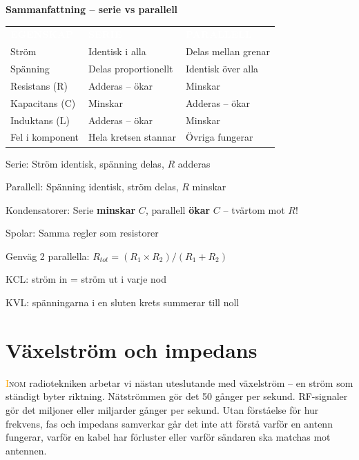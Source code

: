 \documentclass[a4paper,11pt,twoside]{book}
\newcommand{\emoji}[1]{{\emojifont #1}}
\newcommand{\tblhdr}[1]{\cellcolor{greydark}\textcolor{white}{\headingfont\bfseries\footnotesize\MakeUppercase{#1}}}
\begin{document}
\begin{center}
\noindent\textbf{Sammanfattning -- serie vs parallell}\\[4mm]
\begin{tabular}{L{3cm}L{3.5cm}L{3.5cm}}
\tblhdr{Egenskap} & \tblhdr{Serie} & \tblhdr{Parallell} \\
Ström & Identisk i alla & Delas mellan grenar \\
Spänning & Delas proportionellt & Identisk över alla \\
Resistans (R) & Adderas -- ökar & Minskar \\
Kapacitans (C) & Minskar & Adderas -- ökar \\
Induktans (L) & Adderas -- ökar & Minskar \\
Fel i komponent & Hela kretsen stannar & Övriga fungerar \\
\end{tabular}
\end{center}

\begin{orangebox}[title={\emoji{🎯} Viktigt för provet}]
\begin{checklist}
  \item Serie: Ström identisk, spänning delas, $R$ adderas
  \item Parallell: Spänning identisk, ström delas, $R$ minskar
  \item Kondensatorer: Serie \textbf{minskar} $C$, parallell \textbf{ökar} $C$ -- tvärtom mot $R$!
  \item Spolar: Samma regler som resistorer
  \item Genväg 2 parallella: $R_{tot} = (R_1 \times R_2) / (R_1 + R_2)$
  \item KCL: ström in = ström ut i varje nod
  \item KVL: spänningarna i en sluten krets summerar till noll
\end{checklist}
\end{orangebox}

\section{Växelström och impedans}

\lettrine[lines=2]{\textcolor{orange}{I}}{nom} radiotekniken arbetar vi nästan uteslutande med 
växelström -- en ström som ständigt byter riktning. 
Nätströmmen gör det 50 gånger per sekund. RF-signaler 
gör det miljoner eller miljarder gånger per sekund. 
Utan förståelse för hur frekvens, fas och impedans samverkar 
går det inte att förstå varför en antenn fungerar, varför 
en kabel har förluster eller varför sändaren ska matchas 
mot antennen.
\end{document}
